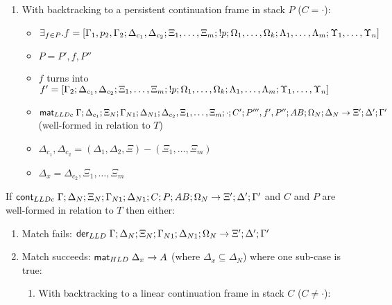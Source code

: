{\begin{lemma}
\begin{enumerate}
\begin{enumerate}
         \item With backtracking to a persistent continuation frame in stack $P$ ($C = \cdot$):

         \begin{itemize}
            \item $\exists_{f \in P}. f = [\Gamma_1, p_2, \Gamma_2; \Delta_{c_1}, \Delta_{c_2};
         \Xi_1, \dotsc, \Xi_m; {!} p; \Omega_1, \dotsc, \Omega_k; \Lambda_1,
         \dotsc, \Lambda_m; \Upsilon_1, \dotsc, \Upsilon_n]$
            \item $P = P', f, P''$
            \item $f$ turns into $f' = [\Gamma_2; \Delta_{c_1},
               \Delta_{c_2}; \Xi_1, \dotsc, \Xi_m; {!} p; \Omega_1, \dotsc,
               \Omega_k; \Lambda_1, \dotsc, \Lambda_m; \Upsilon_1, \dotsc, \Upsilon_n]$
            \item $\mathsf{mat}_{LLDc} \; \Gamma; \Delta_{c_1}; \Xi_N; \Gamma_{N1}; \Delta_{N1};
            \Delta_{c_2}, \Xi_1, \dotsc, \Xi_m; \cdot; C'; P''', f', P'';
            AB; \Omega_N; \Delta_N \rightarrow \Xi'; \Delta'; \Gamma'$
            (well-formed in relation to $T$)
            \item $\Delta_{c_1}, \Delta_{c_2} = (\Delta_1, \Delta_2, \Xi) - (\Xi_1, \dotsc,
                  \Xi_m)$
            \item $\Delta_x = \Delta_{c_2}, \Xi_1, \dotsc, \Xi_m$
         \end{itemize}
      \end{enumerate}
   \end{enumerate}
   
If $\mathsf{cont}_{LLDc} \; \Gamma; \Delta_{N}; \Xi_{N}; \Gamma_{N1}; \Delta_{N1}; C; P;
AB; \Omega_N \rightarrow \Xi'; \Delta'; \Gamma'$ and $C$ and $P$ are
well-formed in relation to $T$ then either:

\begin{enumerate}
   \item Match fails: $\mathsf{der}_{LLD} \; \Gamma; \Delta_N; \Xi_N; \Gamma_{N1}; \Delta_{N1}; \Omega_N \rightarrow \Xi'; \Delta'; \Gamma'$
   
   \item Match succeeds: $\mathsf{mat}_{HLD} \; \Delta_x \rightarrow A$ (where $\Delta_x \subseteq \Delta_N$) where one sub-case is true:
   
   \begin{enumerate}
      \item With backtracking to a linear continuation frame in stack $C$ ($C \neq \cdot$):


\end{enumerate}
\end{enumerate}
\end{lemma}}
